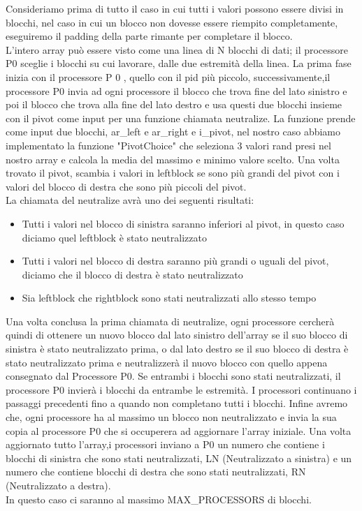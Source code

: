 Consideriamo prima di tutto il caso in cui tutti i valori possono essere divisi in blocchi, nel caso in cui un blocco non dovesse essere riempito completamente, eseguiremo il padding della parte rimante per completare il blocco. \\
L'intero array può essere visto come una linea di N blocchi di dati; il processore P0 sceglie i blocchi su cui lavorare, dalle due estremità della linea.
La prima fase inizia con il processore P 0 , quello con il pid più piccolo, successivamente,il processore P0 invia ad ogni processore il blocco che trova fine del lato sinistro e poi il blocco che trova alla fine del lato destro e usa questi due blocchi insieme con il pivot come input per una funzione chiamata neutralize. La funzione prende come input due blocchi, ar\_left e ar\_right e i\_pivot, nel nostro caso abbiamo implementato la funzione "PivotChoice" che seleziona 3 valori rand presi nel nostro array e calcola la media del massimo e minimo valore scelto. Una volta trovato il pivot, scambia i valori in leftblock se sono più grandi del pivot con i valori del blocco di destra che sono più piccoli del pivot. \\
La chiamata del neutralize avrà uno dei seguenti risultati:

\begin{itemize}
\item Tutti i valori nel blocco di sinistra saranno inferiori al pivot, in questo caso diciamo quel leftblock è stato neutralizzato
\item Tutti i valori nel blocco di destra saranno più grandi o uguali
del pivot, diciamo che il blocco di destra è stato neutralizzato
\item Sia leftblock che rightblock sono stati neutralizzati allo stesso
tempo
\end{itemize}
 
Una volta conclusa la prima chiamata di neutralize, ogni processore cercherà quindi di ottenere un nuovo blocco dal lato sinistro dell'array se il suo blocco di sinistra è stato neutralizzato prima, o dal lato destro se il suo blocco di destra è stato neutralizzato prima e neutralizzerà il nuovo blocco con quello appena consegnato dal Processore P0. Se entrambi i blocchi sono stati neutralizzati, il processore P0 invierà i blocchi da entrambe le estremità. I processori continuano i passaggi precedenti fino a quando non completano tutti i blocchi. Infine avremo che, ogni processore ha al massimo un blocco non neutralizzato
e invia la sua copia al processore P0 che si occuperera ad aggiornare l'array iniziale.
Una volta aggiornato tutto l'array,i processori inviano a P0 un numero che contiene i blocchi di sinistra che sono stati neutralizzati, LN (Neutralizzato a sinistra) e un numero che contiene blocchi di destra che sono stati neutralizzati, RN (Neutralizzato a destra).\\
In questo caso ci saranno al massimo MAX\_PROCESSORS di blocchi.

